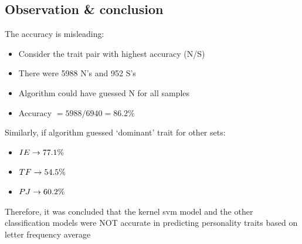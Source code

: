 \documentclass{article}
\begin{document}
\subsection{Observation \& conclusion}
The accuracy is misleading:
\begin{itemize}
  \item Consider the trait pair with highest accuracy (N/S)
  \item There were 5988 N’s and 952 S’s
  \item Algorithm could have guessed N for all samples
  \item Accuracy $= 5988/6940 = 86.2\%$
\end{itemize}
Similarly, if algorithm guessed ‘dominant’ trait for other sets:
\begin{itemize}
  \item $I\/E \rightarrow 77.1\%$
  \item $T\/F \rightarrow 54.5\%$
  \item $P\/J \rightarrow 60.2\%$
\end{itemize}

Therefore, it was concluded that the kernel svm model and the other classification models were NOT accurate in predicting personality traits based on letter frequency average











\end{document}
